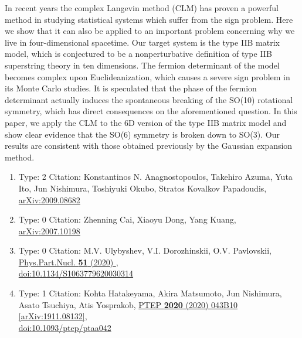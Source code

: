 \documentclass[a4paper,10pt]{article}
\begin{document}
\begin{enumerate}
In recent years the complex Langevin method (CLM) has proven a powerful method in studying statistical systems which suffer from the sign problem. Here we show that it can also be applied to an important problem concerning why we live in four-dimensional spacetime. Our target system is the type IIB matrix model, which is conjectured to be a nonperturbative definition of type IIB superstring theory in ten dimensions. The fermion determinant of the model becomes complex upon Euclideanization, which causes a severe sign problem in its Monte Carlo studies. It is speculated that the phase of the fermion determinant actually induces the spontaneous breaking of the SO(10) rotational symmetry, which has direct consequences on the aforementioned question. In this paper, we apply the CLM to the 6D version of the type IIB matrix model and show clear evidence that the SO(6) symmetry is broken down to SO(3). Our results are consistent with those obtained previously by the Gaussian expansion method.
\begin{enumerate}
  \item Type: 2 Citation: Konstantinos N. Anagnostopoulos, Takehiro Azuma, Yuta Ito, Jun Nishimura, Toshiyuki Okubo, Stratos Kovalkov Papadoudis, \href{https://arxiv.org/abs/2009.08682}{arXiv:2009.08682}
  \item Type: 0 Citation: Zhenning Cai, Xiaoyu Dong, Yang Kuang, \href{https://arxiv.org/abs/2007.10198}{arXiv:2007.10198}
  \item Type: 0 Citation: M.V. Ulybyshev, V.I. Dorozhinskii, O.V. Pavlovskii, \href{https://www.doi.org/10.1134/S1063779620030314}{Phys.Part.Nucl. {\bf 51} (2020) },\\\href{https://www.doi.org/10.1134/S1063779620030314}{doi:10.1134/S1063779620030314}
  \item Type: 1 Citation: Kohta Hatakeyama, Akira Matsumoto, Jun Nishimura, Asato Tsuchiya, Atis Yosprakob, \href{https://www.doi.org/10.1093/ptep/ptaa042}{PTEP {\bf 2020} (2020) 043B10}  \href{https://arxiv.org/abs/1911.08132}{[arXiv:1911.08132]},\\\href{https://www.doi.org/10.1093/ptep/ptaa042}{doi:10.1093/ptep/ptaa042}

\end{enumerate}
\end{enumerate}
\end{document}
